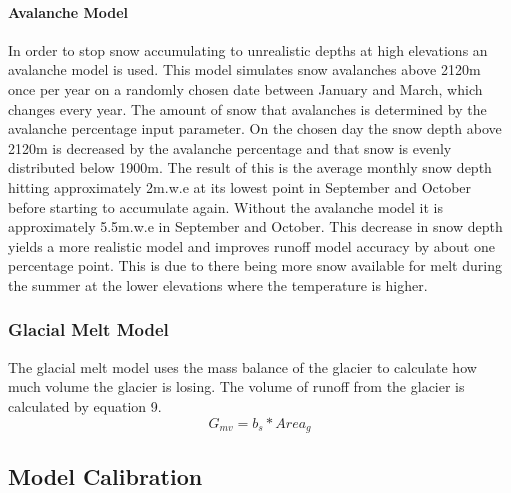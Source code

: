 \documentclass{article}
\begin{document}
\paragraph{Avalanche Model}
In order to stop snow accumulating to unrealistic depths at high elevations an avalanche model is used. This model simulates snow 
avalanches above 2120m once per year on a randomly chosen date between January and March, which changes every year. The amount of snow that 
avalanches is determined by the avalanche percentage input parameter. On the chosen day the snow depth above 2120m is decreased by the avalanche 
percentage and that snow is evenly distributed below 1900m. The result of this is the average monthly snow depth hitting approximately 2m.w.e at its lowest point 
in September and October before starting to accumulate again. Without the avalanche model it is approximately 5.5m.w.e 
in September and October. This decrease in snow depth yields a more realistic model and improves runoff model accuracy by about 
one percentage point. This is due to there being more snow available for melt during the summer at the lower elevations where the 
temperature is higher.

\subsubsection{Glacial Melt Model}
The glacial melt model uses the mass balance of the glacier to calculate how much volume the glacier is losing. The volume of runoff from the 
glacier is calculated by equation 9.
\begin{equation}G_{mv}=b_s*{Area}_{g}\label{tab:glacier_melt_eq}\end{equation}
\subsection{Model Calibration}
\end{document}
